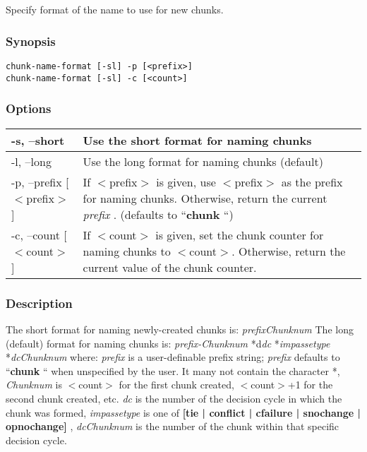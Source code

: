 \subsection{}
\label{chunk-name-format}
Specify format of the name to use for new chunks. 
\subsubsection*{Synopsis}
\begin{verbatim}
chunk-name-format [-sl] -p [<prefix>]
chunk-name-format [-sl] -c [<count>]
\end{verbatim}
\subsubsection*{Options}
\begin{tabular}{|l|l|}
\hline 
 -s, --short  & Use the short format for naming chunks  \\
 \hline 
 -l, --long  & Use the long format for naming chunks (default)  \\
 \hline 
 -p, --prefix [$<$prefix$>$]  & If $<$prefix$>$ is given, use $<$prefix$>$ as the prefix for naming chunks. Otherwise, return the current \emph{prefix}
. (defaults to ``\textbf{chunk}
``)  \\
 \hline 
 -c, --count [$<$count$>$]  & If $<$count$>$ is given, set the chunk counter for naming chunks to $<$count$>$. Otherwise, return the current value of the chunk counter.  \\
 \hline 
\end{tabular}
\subsubsection*{Description}
 The short format for naming newly-created chunks is: 
 \emph{prefixChunknum}
 The long (default) format for naming chunks is: 
 \emph{prefix-Chunknum}
*d\emph{dc}
*\emph{impassetype}
*\emph{dcChunknum}
 where: 
 \emph{prefix}
 is a user-definable prefix string; \emph{prefix}
 defaults to ``\textbf{chunk}
`` when unspecified by the user. It many not contain the character *, 
 \emph{Chunknum}
 is $<$count$>$ for the first chunk created, $<$count$>$+1 for the second chunk created, etc. 
 \emph{dc}
 is the number of the decision cycle in which the chunk was formed, 
 \emph{impassetype}
 is one of \textbf{[tie | conflict | cfailure | snochange | opnochange]}
, 
 \emph{dcChunknum}
 is the number of the chunk within that specific decision cycle. 
